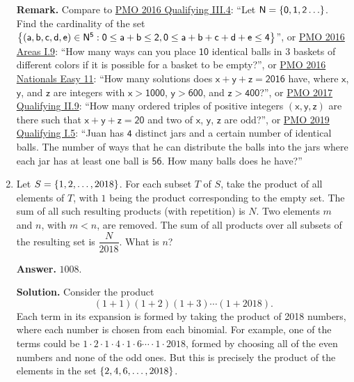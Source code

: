 \documentclass[11pt,paper=letter]{scrartcl}
\begin{document}
\begin{enumerate}[left=0pt]
{\small \sffamily \textbf{Remark.} Compare to \href{http://pmo.ph/wp-content/uploads/2015/10/18thPMO-QualifyingRound-Questions.pdf}{PMO 2016 Qualifying III.4}: ``Let $\mathsf{N = \left\{ 0, 1, 2 \ldots \right\}}$. Find the cardinality of the set $\mathsf{\left\{ (a, b, c, d, e) \in N^5 : 0 \leq a + b \leq 2, 0 \leq a + b + c + d + e \leq 4 \right\}}$'', or \href{http://pmo.ph/wp-content/uploads/2014/08/18th-PMO-Area-Stage.pdf}{PMO 2016 Areas I.9}: ``How many ways can you place $\mathsf{10}$ identical balls in 3 baskets of different colors if it is possible for a basket to be empty?'', or \href{http://pmo.ph/wp-content/uploads/2014/08/18th-PMO-National-Stage-Oral-Phase-Q-and-A.pdf}{PMO 2016 Nationals Easy 11}: ``How many solutions does $\mathsf{x + y + z = 2016}$ have, where $\mathsf{x}$, $\mathsf{y}$, and $\mathsf{z}$ are integers with $\mathsf{x > 1000}$, $\mathsf{y > 600}$, and $\mathsf{z > 400}$?'', or \href{http://pmo.ph/wp-content/uploads/2014/08/19th-PMO-Qualifying-Stage-Questions-and-Answers.pdf}{PMO 2017 Qualifying II.9}: ``How many ordered triples of positive integers $\mathsf{(x, y, z)}$ are there such that $\mathsf{x + y + z = 20}$ and two of $\mathsf{x}$, $\mathsf{y}$, $\mathsf{z}$ are odd?'', or \href{http://cjquines.com/files/pmo2019quals.pdf}{PMO 2019 Qualifying I.5}: ``Juan has $\mathsf{4}$ distinct jars and a certain number of identical balls. The number of ways that he can distribute the balls into the jars where each jar has at least one ball is $\mathsf{56}$. How many balls does he have?''}

\item Let $S = \left\{ 1, 2, \ldots, 2018 \right\}$. For each subset $T$ of $S$, take the product of all elements of $T$, with $1$ being the product corresponding to the empty set. The sum of all such resulting products (with repetition) is $N$. Two elements $m$ and $n$, with $m < n$, are removed. The sum of all products over all subsets of the resulting set is $\dfrac{N}{2018}$. What is $n$?

{\sffamily \bfseries Answer.} $\boxed{1008}$.

{\sffamily \bfseries Solution.} Consider the product $$(1 + 1)(1 + 2)(1 + 3) \cdots (1 + 2018).$$ Each term in its expansion is formed by taking the product of 2018 numbers, where each number is chosen from each binomial. For example, one of the terms could be $1 \cdot 2 \cdot 1 \cdot 4 \cdot 1 \cdot 6 \cdots \cdot 1 \cdot 2018$, formed by choosing all of the even numbers and none of the odd ones. But this is precisely the product of the elements in the set $\left\{ 2, 4, 6, \ldots, 2018 \right\}$. 


\end{enumerate}
\end{document}
